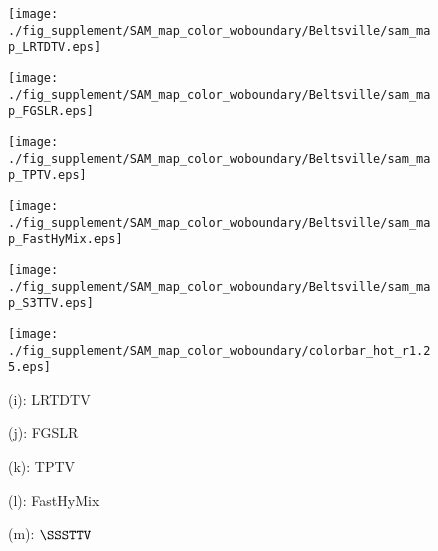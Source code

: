 \begin{figure*}[t]
\begin{center}
		\begin{minipage}{0.15\hsize}
			\centerline{\hspace{\hsize}} %
		\end{minipage}
		\begin{minipage}{0.15\hsize}
			\centerline{\texttt{[image: ./fig\_supplement/SAM\_map\_color\_woboundary/Beltsville/sam\_map\_LRTDTV.eps]}} %
		\end{minipage}
		\begin{minipage}{0.15\hsize}
			\centerline{\texttt{[image: ./fig\_supplement/SAM\_map\_color\_woboundary/Beltsville/sam\_map\_FGSLR.eps]}} %
		\end{minipage}
		\begin{minipage}{0.15\hsize}
			\centerline{\texttt{[image: ./fig\_supplement/SAM\_map\_color\_woboundary/Beltsville/sam\_map\_TPTV.eps]}} %
		\end{minipage}
		\begin{minipage}{0.15\hsize}
			\centerline{\texttt{[image: ./fig\_supplement/SAM\_map\_color\_woboundary/Beltsville/sam\_map\_FastHyMix.eps]}} %
		\end{minipage}
		\begin{minipage}{0.15\hsize}
			\centerline{\texttt{[image: ./fig\_supplement/SAM\_map\_color\_woboundary/Beltsville/sam\_map\_S3TTV.eps]}} %
		\end{minipage}
		\begin{minipage}{0.050\hsize}
			\centerline{\texttt{[image: ./fig\_supplement/SAM\_map\_color\_woboundary/colorbar\_hot\_r1.25.eps]}} %
		\end{minipage}
		
		\vspace{1mm}
		
		\begin{minipage}{0.15\hsize}
			\centerline{\hspace{\hsize}} %
		\end{minipage}
		\begin{minipage}{0.15\hsize}
			\centerline{\small{(i): LRTDTV}}
		\end{minipage}
		\begin{minipage}{0.15\hsize}
			\centerline{\small{(j): FGSLR}}
		\end{minipage}
		\begin{minipage}{0.15\hsize}
			\centerline{\small{(k): TPTV}}
		\end{minipage}
		\begin{minipage}{0.15\hsize}
			\centerline{\small{(l): FastHyMix}}
		\end{minipage}
		\begin{minipage}{0.15\hsize}
			\centerline{\small{(m): $\SSSTTV$}}
		\end{minipage}
		\begin{minipage}{0.050\hsize}
			\centerline{\hspace{\hsize}} %
		\end{minipage}
		

\end{center}
\end{figure*}
